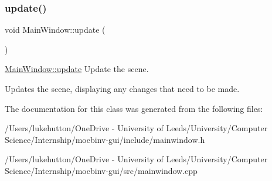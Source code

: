 \subsubsection{\texorpdfstring{update()}{update()}}
{\footnotesize\ttfamily void Main\+Window\+::update (\begin{DoxyParamCaption}{ }\end{DoxyParamCaption})}



\mbox{\hyperlink{class_main_window_a128f71880d4b9683149023fc46fcc9f8}{Main\+Window\+::update}} Update the scene. 

Updates the scene, displaying any changes that need to be made. 

The documentation for this class was generated from the following files\+:\begin{DoxyCompactItemize}
\item 
/\+Users/lukehutton/\+One\+Drive -\/ University of Leeds/\+University/\+Computer Science/\+Internship/moebinv-\/gui/include/mainwindow.\+h\item 
/\+Users/lukehutton/\+One\+Drive -\/ University of Leeds/\+University/\+Computer Science/\+Internship/moebinv-\/gui/src/mainwindow.\+cpp\end{DoxyCompactItemize}
